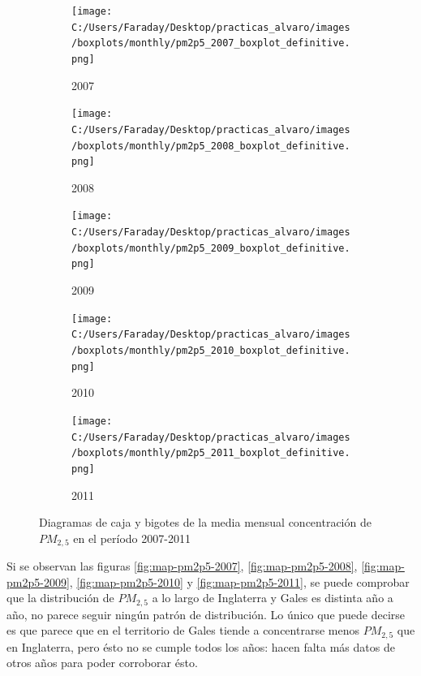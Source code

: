 \documentclass[12pt]{article}
\begin{document}
\begin{figure}[H]
\centering
\begin{subfigure}[H]{0.30\textwidth}
\texttt{[image: C:/Users/Faraday/Desktop/practicas\_alvaro/images/boxplots/monthly/pm2p5\_2007\_boxplot\_definitive.png]}
\captionsetup{labelformat=empty}
\caption{2007}
\label{fig:box-pm2p5-2007}
\end{subfigure}
%
\begin{subfigure}[H]{0.30\textwidth}
\texttt{[image: C:/Users/Faraday/Desktop/practicas\_alvaro/images/boxplots/monthly/pm2p5\_2008\_boxplot\_definitive.png]}
\captionsetup{labelformat=empty}
\caption{2008}
\label{fig:box-pm2p5-2008}
\end{subfigure}
%
\begin{subfigure}[H]{0.30\textwidth}
\texttt{[image: C:/Users/Faraday/Desktop/practicas\_alvaro/images/boxplots/monthly/pm2p5\_2009\_boxplot\_definitive.png]}
\captionsetup{labelformat=empty}
\caption{2009}
\label{fig:box-pm2p5-2009}
\end{subfigure}

\begin{subfigure}[H]{0.30\textwidth}
\texttt{[image: C:/Users/Faraday/Desktop/practicas\_alvaro/images/boxplots/monthly/pm2p5\_2010\_boxplot\_definitive.png]}
\captionsetup{labelformat=empty}
\caption{2010}
\label{fig:box-pm2p5-2010}
\end{subfigure}
%
\begin{subfigure}[H]{0.30\textwidth}
\texttt{[image: C:/Users/Faraday/Desktop/practicas\_alvaro/images/boxplots/monthly/pm2p5\_2011\_boxplot\_definitive.png]}
\captionsetup{labelformat=empty}
\caption{2011}
\label{fig:box-pm2p5-2011}
\end{subfigure}
\caption{Diagramas de caja y bigotes de la media mensual concentración de $PM_{2,5}$ en el período 2007-2011}
\label{fig:box-pm2p5-monthly}
\end{figure}

Si se observan las figuras \ref{fig:map-pm2p5-2007}, \ref{fig:map-pm2p5-2008}, \ref{fig:map-pm2p5-2009}, \ref{fig:map-pm2p5-2010} y \ref{fig:map-pm2p5-2011}, se puede comprobar que la distribución de $PM_{2,5}$ a lo largo de Inglaterra y Gales es distinta año a año, no parece seguir ningún patrón de distribución. Lo único que puede decirse es que parece que en el territorio de Gales tiende a concentrarse menos $PM_{2,5}$ que en Inglaterra, pero ésto no se cumple todos los años: hacen falta más datos de otros años para poder corroborar ésto.
\end{document}

